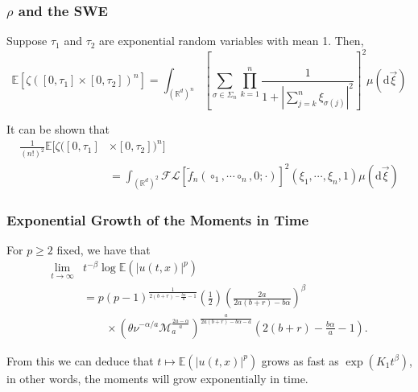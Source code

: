 \documentclass{beamer}
\numberwithin{equation}{section}
\newcommand{\R}{\mathbb{R}}
\newcommand{\E}{\mathbb{E}}
\newcommand{\ud}{\ensuremath{\mathrm{d}}}
\begin{document}
		\begin{frame}[t]
		\frametitle{$\rho$ and the SWE}
	\begin{theorem}[X. Chen]
		Suppose $\tau_1$ and $\tau_2$ are exponential random variables with mean 1. Then,
		\[
		\mathbb{E}\left[ \zeta\left([0,\tau_1] \times [0,\tau_2]\right)^n \right] = \int_{(\R^{d})^n} \left[ \sum_{\sigma \in \Sigma_n} \prod_{k=1}^n \frac{1}{ 1 + \left| \sum_{j=k}^n  \xi_{\sigma(j)} \right|^2 } \right]^2 \mu(\ud \vec{\xi})
		\]
	\end{theorem}
It can be shown that 
	\begin{align*}
		\frac{1}{(n!)^2}\mathbb{E}[ \zeta ( [0,\tau_1]  &\times [0,\tau_2] )^n ] 
		\\ &= \int_{(\R^d)^2} \mathcal{F}\mathcal{L}\left[\tilde{f}_n(\circ_1,\cdots\circ_n,0;\cdot)\right]^2(\xi_1, \cdots,\xi_n,1) \mu(\ud \vec{\xi})
	\end{align*}
	
	\end{frame}

	\begin{frame}[t]																																																							
		\frametitle{Exponential Growth of the Moments in Time}
		\begin{theorem} For $p \ge 2$ fixed, we have that
			\begin{align*}
			\lim_{t \to \infty} & t^{-\beta} \log \E\left(|u(t,x)|^p\right) 
			\\&=  p(p-1)^{\frac{1}{2(b+r)-\frac{b\alpha}{a} -1}} \left(\frac{1}{2}\right)\left(\frac{2a}{2a(b+r)- b\alpha} \right)^\beta \\
			& \quad \quad \times \left(\theta\nu^{-\alpha/a} \mathcal{M}_a^{\frac{2a-\alpha}{a}}\right)^{\frac{a}{2a(b+r)-b\alpha-a}}\left(2(b+r)-\frac{b\alpha}{a}-1\right).
			\end{align*}
		\end{theorem}
From this we can deduce that $t \mapsto \mathbb{E}(|u(t,x)|^p)$ grows as fast as $\exp\left({K_1 t^\beta }\right)$, in other words, the moments will grow exponentially in time. 

		
	\end{frame}
	
\end{document}
